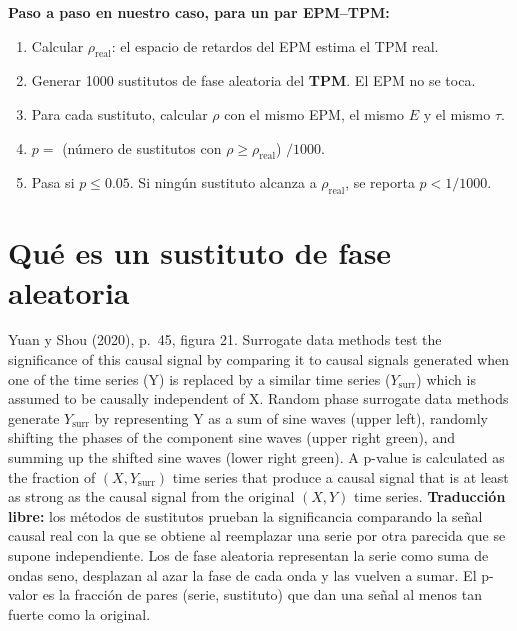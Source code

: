 \documentclass[11pt,openany]{book}
\begin{document}
\textbf{Paso a paso en nuestro caso, para un par EPM--TPM:}
\begin{enumerate}
\item Calcular $\rho_{\text{real}}$: el espacio de retardos del EPM estima el TPM real.
\item Generar 1000 sustitutos de fase aleatoria del \textbf{TPM}. El EPM no se toca.
\item Para cada sustituto, calcular $\rho$ con el mismo EPM, el mismo $E$ y el mismo $\tau$.
\item $p = $ (número de sustitutos con $\rho \ge \rho_{\text{real}}$) $/ 1000$.
\item Pasa si $p \le 0.05$. Si ningún sustituto alcanza a $\rho_{\text{real}}$, se reporta $p < 1/1000$.
\end{enumerate}

\section{Qué es un sustituto de fase aleatoria}

\begin{cita}{Yuan y Shou (2020), p.~45, figura 21.}
Surrogate data methods test the significance of this causal signal by comparing it to causal signals generated when one of the time series (Y) is replaced by a similar time series ($Y_{\text{surr}}$) which is assumed to be causally independent of X. Random phase surrogate data methods generate $Y_{\text{surr}}$ by representing Y as a sum of sine waves (upper left), randomly shifting the phases of the component sine waves (upper right green), and summing up the shifted sine waves (lower right green). A p-value is calculated as the fraction of $(X, Y_{\text{surr}})$ time series that produce a causal signal that is at least as strong as the causal signal from the original $(X, Y)$ time series.
\tcblower
\textbf{Traducción libre:} los métodos de sustitutos prueban la significancia comparando la señal causal real con la que se obtiene al reemplazar una serie por otra parecida que se supone independiente. Los de fase aleatoria representan la serie como suma de ondas seno, desplazan al azar la fase de cada onda y las vuelven a sumar. El p-valor es la fracción de pares (serie, sustituto) que dan una señal al menos tan fuerte como la original.
\end{cita}
\end{document}
